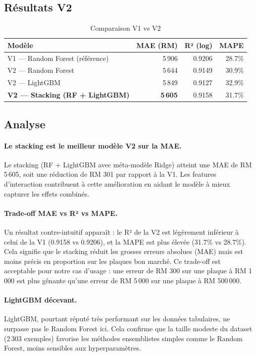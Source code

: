 \documentclass[12pt, a4paper]{article}
\begin{document}
\subsection{Résultats V2}

\begin{table}[H]
\centering
\begin{tabular}{lrrr}
\toprule
\textbf{Modèle} & \textbf{MAE (RM)} & \textbf{R² (log)} & \textbf{MAPE} \\
\midrule
V1 — Random Forest (référence) & 5\,906 & 0.9206 & 28.7\% \\
\midrule
V2 — Random Forest & 5\,644 & 0.9149 & 30.9\% \\
V2 — LightGBM & 5\,849 & 0.9127 & 32.9\% \\
\textbf{V2 — Stacking (RF + LightGBM)} & \textbf{5\,605} & 0.9158 & 31.7\% \\
\bottomrule
\end{tabular}
\caption{Comparaison V1 vs V2}
\end{table}

\subsection{Analyse}

\paragraph{Le stacking est le meilleur modèle V2 sur la MAE.}
Le stacking (RF + LightGBM avec méta-modèle Ridge) atteint une MAE de RM 5\,605, soit une réduction de RM 301 par rapport à la V1. Les features d'interaction contribuent à cette amélioration en aidant le modèle à mieux capturer les effets combinés.

\paragraph{Trade-off MAE vs R² vs MAPE.}
Un résultat contre-intuitif apparaît : le R² de la V2 est légèrement inférieur à celui de la V1 (0.9158 vs 0.9206), et la MAPE est plus élevée (31.7\% vs 28.7\%). Cela signifie que le stacking réduit les grosses erreurs absolues (MAE) mais est moins précis en proportion sur les plaques bon marché. Ce trade-off est acceptable pour notre cas d'usage : une erreur de RM 300 sur une plaque à RM 1\,000 est plus gênante qu'une erreur de RM 5\,000 sur une plaque à RM 500\,000.

\paragraph{LightGBM décevant.}
LightGBM, pourtant réputé très performant sur les données tabulaires, ne surpasse pas le Random Forest ici. Cela confirme que la taille modeste du dataset (2\,303 exemples) favorise les méthodes ensemblistes simples comme le Random Forest, moins sensibles aux hyperparamètres.
\end{document}
